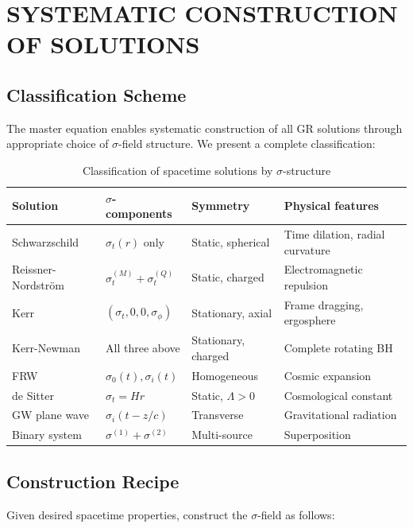 \documentclass[11pt,a4paper]{article}
\theoremstyle{definition}
\theoremstyle{remark}
\begin{document}
	\section{SYSTEMATIC CONSTRUCTION OF SOLUTIONS}
	\label{sec:systematic}
	
	\subsection{Classification Scheme}
	
	The master equation enables systematic construction of all GR solutions through appropriate choice of $\sigma$-field structure. We present a complete classification:
	
	\begin{table}[h]
		\centering
		\caption{Classification of spacetime solutions by $\sigma$-structure}
		\label{tab:solution_classification}
		\begin{tabular}{lllp{4cm}}
			\toprule
			Solution & $\sigma$-components & Symmetry & Physical features \\
			\midrule
			Schwarzschild & $\sigma_t(r)$ only & Static, spherical & Time dilation, radial curvature \\
			Reissner-Nordström & $\sigma_t^{(M)} + \sigma_t^{(Q)}$ & Static, charged & Electromagnetic repulsion \\
			Kerr & $(\sigma_t, 0, 0, \sigma_\phi)$ & Stationary, axial & Frame dragging, ergosphere \\
			Kerr-Newman & All three above & Stationary, charged & Complete rotating BH \\
			FRW & $\sigma_0(t), \sigma_i(t)$ & Homogeneous & Cosmic expansion \\
			de Sitter & $\sigma_t = Hr$ & Static, $\Lambda > 0$ & Cosmological constant \\
			GW plane wave & $\sigma_i(t-z/c)$ & Transverse & Gravitational radiation \\
			Binary system & $\sigma^{(1)} + \sigma^{(2)}$ & Multi-source & Superposition \\
			\bottomrule
		\end{tabular}
	\end{table}
	
	\subsection{Construction Recipe}
	
	Given desired spacetime properties, construct the $\sigma$-field as follows:
	
\end{document}
